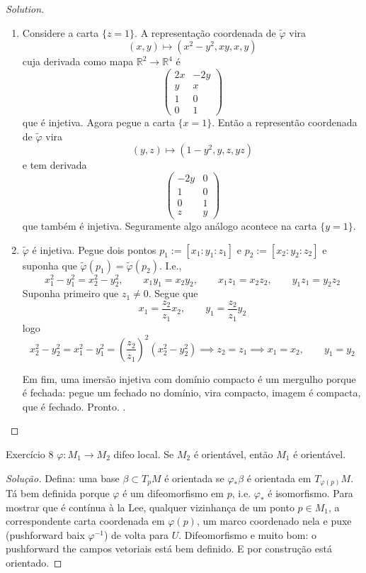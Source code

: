\begin{proof}[Solution]\leavevmode
\begin{enumerate}[label=(\alph*)]
\item Considere a carta \(\{z=1\}\). A representação coordenada de \(\tilde{\varphi}\) vira
	\[(x,y) \longmapsto (x^2-y^2,xy,x,y)\]
cuja derivada como mapa \(\mathbb{R}^2 \to \mathbb{R}^4\) é
\[\begin{pmatrix} 2x& -2y\\y&x\\1&0\\0&1 \end{pmatrix} \]
que é injetiva. Agora pegue a carta \(\{x=1\}\). Então a representão coordenada de \(\tilde{ \varphi}\) vira
\[(y,z) \longmapsto (1-y^2,y,z,yz)\]
e tem derivada
\[\begin{pmatrix} -2y&0\\1&0\\0&1\\z&y \end{pmatrix} \]
que também é injetiva. Seguramente algo análogo acontece na carta \(\{y=1\}\).

\item \(\tilde{\varphi}\) é injetiva. Pegue dois pontos \(p_1:=[x_1:y_1:z_1]\) e \(p_2:=[x_2:y_2:z_2]\) e suponha que \(\tilde{\varphi}(p_1)=\tilde{\varphi}(p_2)\). I.e.,
	\[x_1^2-y_1^2=x_2^2-y_2^2,\qquad x_1y_1=x_2y_2,\qquad x_1z_1=x_2z_2, \qquad y_1z_1=y_2z_2\]
	Suponha primeiro que \(z_1 \neq  0\). Segue que
	\[x_1=\frac{z_2}{z_1}x_2, \qquad y_1=\frac{z_2}{z_1}y_2\]
	logo
	\[x_2^2-y_2^2=x_1^2-y_1^2=\left(\frac{z_2}{z_1}\right)^2(x_2^2-y_2^2)\implies z_2=z_1\implies x_1=x_2,\qquad y_1=y_2\]
	

	Em fim, uma imersão injetiva com domínio compacto é um mergulho porque é fechada: pegue um fechado no domínio, vira compacto, imagem é compacta, que é fechado. Pronto.
.
\end{enumerate}
\end{proof}

\begin{thing4}{Exercício 8}\label{exer:8}\leavevmode
\(\varphi:M_1\to M_2\) difeo local. Se \(M_2\) é orientável, então \(M_1\) é orientável.
\end{thing4}
\begin{proof}[Solução]\leavevmode
Defina: uma base \(\beta \subset T_pM\) é orientada se \(\varphi_*\beta\) é orientada em \(T_{\varphi(p)}M\). Tá bem definida porque \(\varphi\) é um difeomorfismo em \(p\), i.e. \(\varphi_*\) é isomorfismo. Para mostrar que é contínua à la Lee, qualquer vizinhança de um ponto \(p \in M_1\), a correspondente carta coordenada em \(\varphi(p)\), um marco coordenado nela e puxe (pushforward baix \(\varphi^{-1}\)) de volta para \(U\). Difeomorfismo e muito bom: o pushforward the campos vetoriais está bem definido. E por construção está orientado.
\end{proof}
